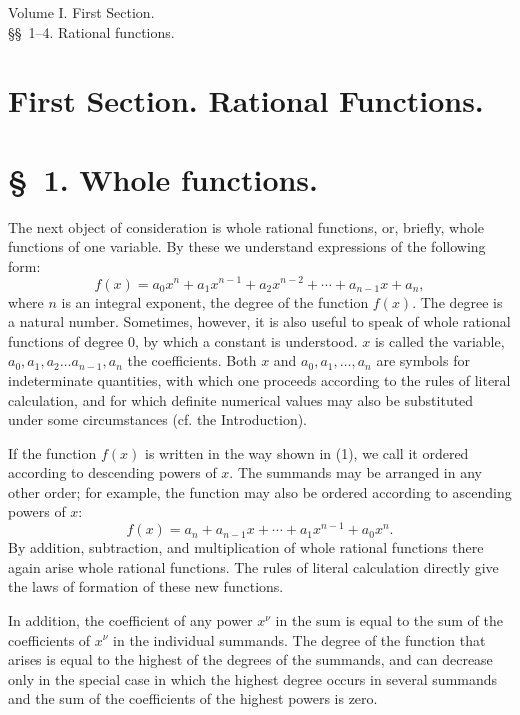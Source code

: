 \documentclass[11pt]{article}
\begin{document}
\begin{center}{\large Volume I. First Section.}\\[0.4em]{\Large \S\S~1--4. Rational functions.}\end{center}

\section*{First Section. Rational Functions.}

\section*{\S~1. Whole functions.}

The next object of consideration is whole rational functions, or, briefly, whole functions of one variable. By these we understand expressions of the following form:
\begin{equation}
 f(x)=a_0x^n+a_1x^{n-1}+a_2x^{n-2}+\cdots+a_{n-1}x+a_n,
\tag{1}
\end{equation}
where $n$ is an integral exponent, the degree of the function $f(x)$. The degree is a natural number. Sometimes, however, it is also useful to speak of whole rational functions of degree $0$, by which a constant is understood. $x$ is called the variable, $a_0,a_1,a_2\ldots a_{n-1},a_n$ the coefficients. Both $x$ and $a_0,a_1,\ldots,a_n$ are symbols for indeterminate quantities, with which one proceeds according to the rules of literal calculation, and for which definite numerical values may also be substituted under some circumstances (cf. the Introduction).

If the function $f(x)$ is written in the way shown in (1), we call it ordered according to descending powers of $x$. The summands may be arranged in any other order; for example, the function may also be ordered according to ascending powers of $x$:
\[
 f(x)=a_n+a_{n-1}x+\cdots+a_1x^{n-1}+a_0x^n.
\]
By addition, subtraction, and multiplication of whole rational functions there again arise whole rational functions. The rules of literal calculation directly give the laws of formation of these new functions.

In addition, the coefficient of any power $x^\nu$ in the sum is equal to the sum of the coefficients of $x^\nu$ in the individual summands. The degree of the function that arises is equal to the highest of the degrees of the summands, and can decrease only in the special case in which the highest degree occurs in several summands and the sum of the coefficients of the highest powers is zero.
\end{document}
